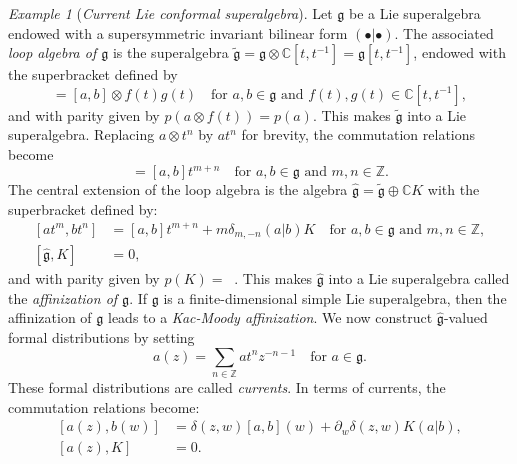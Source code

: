 \documentclass[a4paper, 12pt, reqno]{amsart}
\theoremstyle{remark}
\newtheorem{example}[theorem]{Example}
\DeclareMathOperator{\zero}{\overline{0}}
\begin{document}
\begin{example}[\emph{Current Lie conformal superalgebra}]
  Let $\mathfrak{g}$ be a Lie superalgebra endowed with a supersymmetric invariant bilinear form $(\bullet| \bullet)$.
  The associated \emph{loop algebra of $\mathfrak{g}$} is the superalgebra $\tilde{\mathfrak{g}} = \mathfrak{g} \otimes \mathbb{C}[t, t^{-1}] = \mathfrak{g}[t, t^{-1}]$, endowed with the superbracket defined by
  \begin{equation*}
    [a\otimes f(t), b\otimes g(t)] = [a, b]\otimes f(t)g(t) \quad \text{for $a, b \in \mathfrak{g}$ and $f(t), g(t) \in \mathbb{C}[t, t^{-1}]$},
  \end{equation*}
  and with parity given by $p(a\otimes f(t)) = p(a)$.
  This makes $\tilde{\mathfrak{g}}$ into a Lie superalgebra.
  Replacing $a\otimes t^n$ by $at^n$ for brevity, the commutation relations become
  \begin{equation*}
    [at^m, bt^n] = [a, b]t^{m + n} \quad \text{for $a, b \in \mathfrak{g}$ and $m, n \in \mathbb{Z}$}.
  \end{equation*}
  The central extension of the loop algebra is the algebra $\hat{\mathfrak{g}} = \tilde{\mathfrak{g}} \oplus \mathbb{C}K$ with the superbracket defined by:
  \begin{equation*}
    \begin{split}
      [at^m, bt^n] &= [a, b]t^{m + n} + m\delta_{m, -n}(a| b)K \quad \text{for $a, b \in \mathfrak{g}$ and $m, n \in \mathbb{Z}$}, \\
      [\hat{\mathfrak{g}}, K] &= 0,
    \end{split}
  \end{equation*}
  and with parity given by $p(K) = \zero$.
  This makes $\hat{\mathfrak{g}}$ into a Lie superalgebra called the \emph{affinization of $\mathfrak{g}$}.
  If $\mathfrak{g}$ is a finite-dimensional simple Lie superalgebra, then the affinization of $\mathfrak{g}$ leads to a \emph{Kac-Moody affinization}.
  We now construct $\hat{\mathfrak{g}}$-valued formal distributions by setting
  \begin{equation*}
    a(z) = \sum_{n \in \mathbb{Z}}at^nz^{-n - 1} \quad \text{for $a \in \mathfrak{g}$}.
  \end{equation*}
  These formal distributions are called \emph{currents}.
  In terms of currents, the commutation relations become:
  \begin{equation*}
    \begin{split}
      [a(z), b(w)] &= \delta(z, w)[a, b](w) + \partial_w\delta(z, w)K(a| b), \\
      [a(z), K] &= 0.
    \end{split}

\end{equation*}
\end{example}
\end{document}
